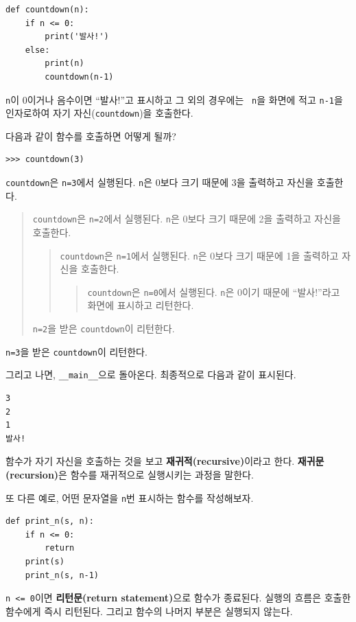 \documentclass[10pt]{book}
\begin{document}
\begin{verbatim}
def countdown(n):
    if n <= 0:
        print('발사!')
    else:
        print(n)
        countdown(n-1)
\end{verbatim}
%
{\tt n}이 0이거나 음수이면 ``발사!''고 표시하고 그 외의 경우에는 {\tt
  n}을 화면에 적고 {\tt n-1}을 인자로하여 자기 자신({\tt countdown})을
호출한다.

다음과 같이 함수를 호출하면 어떻게 될까? 

\begin{verbatim}
>>> countdown(3)
\end{verbatim}
%
{\tt countdown}은 {\tt n=3}에서 실행된다.  {\tt n}은 0보다 크기 때문에
3을 출력하고 자신을 호출한다.


\begin{quote}
{\tt countdown}은 {\tt n=2}에서 실행된다.  {\tt n}은 0보다 크기 때문에
2을 출력하고 자신을 호출한다.


\begin{quote}
{\tt countdown}은 {\tt n=1}에서 실행된다.  {\tt n}은 0보다 크기 때문에
1을 출력하고 자신을 호출한다.


\begin{quote}
{\tt countdown}은 {\tt n=0}에서 실행된다.  {\tt n}은 0이기 때문에 ``발사!''라고 화면에 표시하고 리턴한다. 
\end{quote}

\end{quote}

{\tt n=2}을 받은 {\tt countdown}이 리턴한다.
\end{quote}

{\tt n=3}을 받은 {\tt countdown}이 리턴한다.

그리고 나면, \verb"__main__"으로 돌아온다.  최종적으로 다음과 같이
표시된다.  

\begin{verbatim}
3
2
1
발사!
\end{verbatim}
%
함수가 자기 자신을 호출하는 것을 보고 {\bf 재귀적(recursive)}이라고
한다.  {\bf 재귀문(recursion)}은 함수를 재귀적으로 실행시키는 과정을
말한다.

또 다른 예로, 어떤 문자열을 {\tt n}번 표시하는 함수를 작성해보자.

\begin{verbatim}
def print_n(s, n):
    if n <= 0:
        return
    print(s)
    print_n(s, n-1)
\end{verbatim}
%
{\tt n <= 0}이면 {\bf 리턴문(return statement)}으로 함수가 종료된다.
실행의 흐름은 호출한 함수에게 즉시 리턴된다. 그리고 함수의 나머지
부분은 실행되지 않는다.
\end{document}
